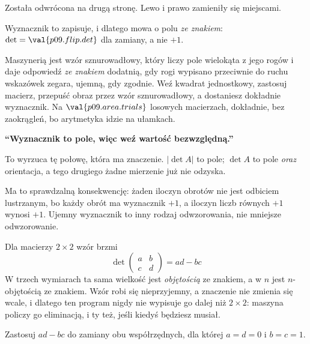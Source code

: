 \begin{fr}
\begin{ansblock}
Została odwrócona na drugą stronę. Lewo i prawo zamieniły się miejscami.
\end{ansblock}

Wyznacznik to zapisuje, i dlatego mowa o polu \emph{ze znakiem}:
$\det = \val{p09.flip.det}$ dla zamiany, a nie $+1$.

Maszynerią jest wzór sznurowadłowy, który liczy pole wielokąta z jego rogów i
daje odpowiedź \emph{ze znakiem} \dash{} dodatnią, gdy rogi wypisano przeciwnie
do ruchu wskazówek zegara, ujemną, gdy zgodnie. Weź kwadrat jednostkowy,
zastosuj macierz, przepuść obraz przez wzór sznurowadłowy, a dostaniesz
dokładnie wyznacznik. Na $\val{p09.area.trials}$ losowych macierzach,
dokładnie, bez zaokrągleń, bo arytmetyka idzie na ułamkach.
\end{fr}

\begin{trapbox}
\textbf{\enquote{Wyznacznik to pole, więc weź wartość bezwzględną.}}

To wyrzuca tę połowę, która ma znaczenie. $\lvert \det A \rvert$ to pole;
$\det A$ to pole \emph{oraz} orientacja, a tego drugiego żadne mierzenie już
nie odzyska.

Ma to sprawdzalną konsekwencję: żaden iloczyn obrotów nie jest odbiciem
lustrzanym, bo każdy obrót ma wyznacznik $+1$, a iloczyn liczb równych $+1$
wynosi $+1$. Ujemny wyznacznik to inny rodzaj odwzorowania, nie mniejsze
odwzorowanie.
\end{trapbox}

\begin{fr}
Dla macierzy $2 \times 2$ wzór brzmi
\[ \det \begin{pmatrix} a & b \\ c & d \end{pmatrix} = ad - bc \]
W trzech wymiarach ta sama wielkość jest \emph{objętością} ze znakiem, a w $n$
jest $n$-objętością ze znakiem. Wzór robi się nieprzyjemny, a znaczenie nie
zmienia się wcale, i dlatego ten program nigdy nie wypisuje go dalej niż
$2 \times 2$: maszyna policzy go eliminacją, i ty też, jeśli kiedyś będziesz
musiał.

Zastosuj $ad - bc$ do zamiany obu współrzędnych, dla której $a = d = 0$ i
$b = c = 1$.
\dotline
\nextframe
\end{fr}

